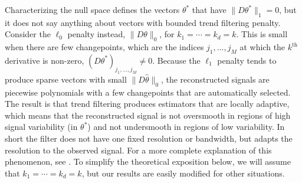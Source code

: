 \documentclass[ejs,noshowframe]{imsart}
\theoremstyle{plain}
\theoremstyle{definition}
\newcommand{\snorm}[1]{\lVert #1 \rVert}
\renewcommand{\hat}{\widehat}
\newcommand{\indicator}{\mathbf{1}}
\begin{document}
Characterizing the null space defines the vectors $\theta^*$ that have $\snorm{
D \theta^* }_1 = 0$, but it does not say anything about vectors with bounded trend filtering
penalty. 
Consider the $\ell_0$ penalty instead, $\snorm{ D \theta }_0$, for $k_1 =
\cdots=k_d = k$. This is small when there are few changepoints, which are the 
indices $j_1, \ldots, j_M$ at which the $k^{\textrm{th}}$ derivative is non-zero, $(D
\theta^*)_{j_1,\ldots,j_M} \ne 0$. 
Because the $\ell_1$ penalty tends to produce sparse vectors with small $\snorm{D \hat
\theta }_0$, the reconstructed signals are piecewise polynomials with a few
changepoints that are automatically selected. 
The result is that trend filtering produces estimators that are locally
adaptive, which means that the reconstructed signal is not oversmooth in regions
of high signal variability (in $\theta^*$) and not undersmooth in regions of low
variability. 
In short the filter does not have one fixed resolution or bandwidth, but adapts
the resolution to the observed signal. 
For a more complete explanation of this phenomenon, see 
\cite{WangSharpnack2016,Bassett2019fused}. To simplify the theoretical exposition below,
we will assume that $k_1=\cdots=k_d=k$, but our results are
easily modified for other situations.

\end{document}
